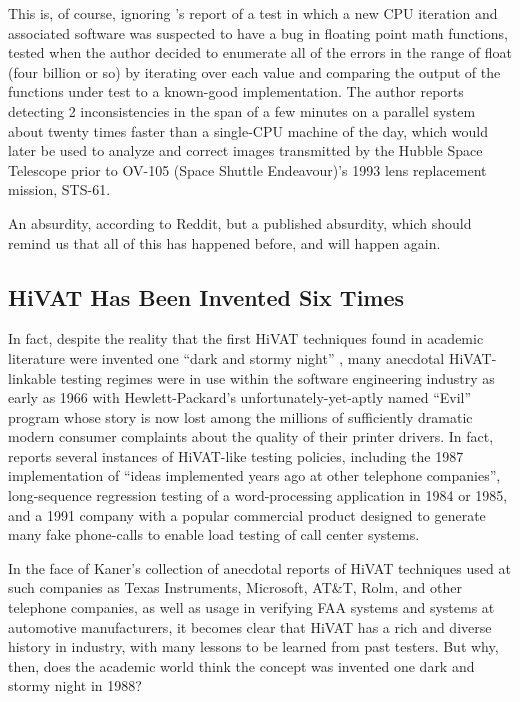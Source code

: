 This is, of course, ignoring \citet{hoffman2003Exhausting}'s report of a test in which a new CPU iteration and associated software was suspected to have a bug in floating point math functions, tested when the author decided to enumerate all of the errors in the range of float (four billion or so) by iterating over each value and comparing the output of the functions under test to a known-good implementation. The author reports detecting 2 inconsistencies in the span of a few minutes on a parallel system about twenty times faster than a single-CPU machine of the day, which would later be used to analyze and correct images transmitted by the Hubble Space Telescope prior to OV-105 (Space Shuttle Endeavour)'s 1993 lens replacement mission, STS-61.

An absurdity, according to Reddit, but a published absurdity, which should remind us that all of this has happened before, and will happen again.

\subsection{HiVAT Has Been Invented Six Times}
In fact, despite the reality that the first HiVAT techniques found in academic literature were invented one ``dark and stormy night'' \citep{miller1989TR830}, many anecdotal HiVAT-linkable testing regimes were in use within the software engineering industry as early as 1966 with Hewlett-Packard's unfortunately-yet-aptly named ``Evil'' program whose story is now lost among the millions of sufficiently dramatic modern consumer complaints about the quality of their printer drivers. In fact, \citet{KanerHivatOverview} reports several instances of HiVAT-like testing policies, including the 1987 implementation of ``ideas implemented years ago at other telephone companies'', long-sequence regression testing of a word-processing application in 1984 or 1985, and a 1991 company with a popular commercial product designed to generate many fake phone-calls to enable load testing of call center systems.

In the face of Kaner's collection of anecdotal reports of HiVAT techniques used at such companies as Texas Instruments, Microsoft, AT\&T, Rolm, and other telephone companies, as well as usage in verifying FAA systems and systems at automotive manufacturers, it becomes clear that HiVAT has a rich and diverse history in industry, with many lessons to be learned from past testers. But why, then, does the academic world think the concept was invented one dark and stormy night in 1988?

